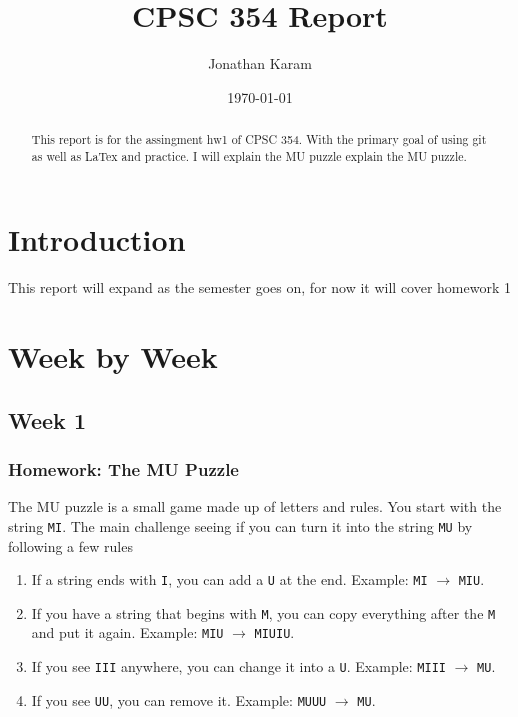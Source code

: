 \documentclass[12pt]{article}
\title{CPSC 354 Report}
\author{Jonathan Karam }
\date{\today}
\begin{document}
\maketitle

\begin{abstract}
This report is for the assingment hw1 of CPSC 354. With the primary goal of using git as well as LaTex and practice. I will explain the MU puzzle explain the MU puzzle.
\end{abstract}

\tableofcontents

\section{Introduction}
This report will expand as the semester goes on, for now it will cover homework 1

\section{Week by Week}

\subsection{Week 1}

\subsubsection*{Homework: The MU Puzzle}

The MU puzzle is a small game made up of letters and rules. You start with the
string \texttt{MI}. The main challenge seeing if you can turn it into the string
\texttt{MU} by following a few rules

\begin{enumerate}
  \item If a string ends with \texttt{I}, you can add a \texttt{U} at the end.  
        Example: \texttt{MI} $\to$ \texttt{MIU}.
  \item If you have a string that begins with \texttt{M}, you can copy everything
        after the \texttt{M} and put it again.  
        Example: \texttt{MIU} $\to$ \texttt{MIUIU}.
  \item If you see \texttt{III} anywhere, you can change it into a \texttt{U}.  
        Example: \texttt{MIII} $\to$ \texttt{MU}.
  \item If you see \texttt{UU}, you can remove it.  
        Example: \texttt{MUUU} $\to$ \texttt{MU}.
\end{enumerate}
\end{document}
